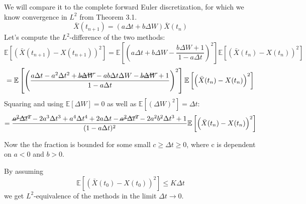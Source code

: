 \documentclass[a4paper,11pt]{scrartcl}
\newcommand*{\Xb}{\bar{X}}
\newcommand*{\D}{\Delta}
\newcommand*{\E}{\mathbb{E}}
\newcommand*{\EV}[1]{\E\left[{#1}\right]}
\newcommand*{\Lt}[1]{\EV{\left({#1}\right)^2}}
\begin{document}
\begin{enumerate}
\begin{enumerate}
  We will compare it to the complete forward Euler discretization, for which we
  know convergence in $L^2$ from Theorem 3.1.
  \[\Xb(t_{n+1}) = (a \D t + b \D W) \Xb(t_n)\]
  Let's compute the $L^2$-difference of the two methods:
  \[\Lt{\Xb(t_{n+1}) - X(t_{n+1})} = \Lt{a \D t + b \D W - \frac{b \D W + 1}{1 - a \D t}}
    \Lt{\Xb(t_{n}) - X(t_n)} \]
  \[ = \Lt{\frac{a \D t - a^2 \D t^2 +\cancel{b \D W} - a b \D t \D W -\cancel{b \D
       W} + 1}{1 - a \D t}}
    \Lt{\Xb(t_{n}) - X(t_n)} \]
  Squaring and using $\EV{\D W} = 0$ as well as $\EV{(\D W)^2} = \D t$:
  \[ = \frac{\cancel{a^2 \D t^2} - 2 a^3 \D t^3 + a^4 \D t^4 +
     2 a \D t -\cancel{a^2 \D t^2} -2 a^2 b^2 \D t^3 + 1}{(1 - a \D t)^2}
     \Lt{\Xb(t_n) - X(t_n)}
  \]

Now the the fraction is bounded for some small $c \geq \D t \geq 0$, where c is
dependent on $a < 0$ and $b > 0$.

By assuming \[ \Lt{\Xb(t_0) - X(t_0)} \leq K \D t \]
we get $L^2$-equivalence of the methods in the limit $\D t \rightarrow 0$.
\end{enumerate}
\end{enumerate}
\end{document}
